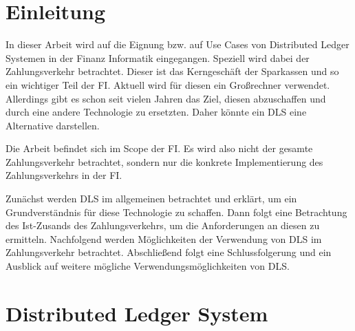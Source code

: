 \documentclass[12pt, a4paper]{article}
\begin{document}
    {
        \setcounter{section}{0}
        \setcounter{page}{1}



    \renewcommand{\figurename}{Abb.}


\noindent %

\section{Einleitung}

In dieser Arbeit wird auf die Eignung bzw. auf Use Cases von Distributed Ledger Systemen in der Finanz Informatik eingegangen.
Speziell wird dabei der Zahlungsverkehr betrachtet. 
Dieser ist das Kerngeschäft der Sparkassen und so ein wichtiger Teil der FI.
Aktuell wird für diesen ein Großrechner verwendet.
Allerdings gibt es schon seit vielen Jahren das Ziel, diesen abzuschaffen und durch eine andere Technologie zu ersetzten.
Daher könnte ein DLS eine Alternative darstellen.

\noindent
Die Arbeit befindet sich im Scope der FI. 
Es wird also nicht der gesamte Zahlungsverkehr betrachtet, sondern nur die konkrete Implementierung des Zahlungsverkehrs in der FI.

\noindent
Zunächst werden DLS im allgemeinen betrachtet und erklärt, um ein Grundverständnis für diese Technologie zu schaffen.
Dann folgt eine Betrachtung des Ist-Zusands des Zahlungsverkehrs, um die Anforderungen an diesen zu ermitteln.
Nachfolgend werden Möglichkeiten der Verwendung von DLS im Zahlungsverkehr betrachtet.
Abschließend folgt eine Schlussfolgerung und ein Ausblick auf weitere mögliche Verwendungsmöglichkeiten von DLS.    
\noindent

\noindent

\section{Distributed Ledger System}
\label{sec:definition-dls}

}
\end{document}
